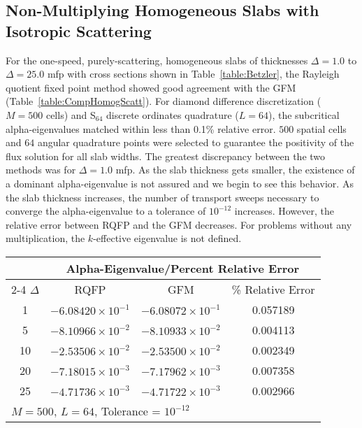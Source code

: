 \subsection{Non-Multiplying Homogeneous Slabs with Isotropic Scattering}
For the one-speed, purely-scattering, homogeneous slabs of thicknesses $\Delta = 1.0$ to $\Delta = 25.0$ mfp with cross sections shown in Table~\ref{table:Betzler}, the Rayleigh quotient fixed point method showed good agreement with the GFM (Table~\ref{table:CompHomogScatt}). For diamond difference discretization ($M = 500$ cells) and S$_{64}$ discrete ordinates quadrature ($L = 64$), the subcritical alpha-eigenvalues matched within less than 0.1\% relative error. $500$ spatial cells and $64$ angular quadrature points were selected to guarantee the positivity of the flux solution for all slab widths. The greatest discrepancy between the two methods was for $\Delta = 1.0$ mfp. As the slab thickness gets smaller, the existence of a dominant alpha-eigenvalue is not assured and we begin to see this behavior. As the slab thickness increases, the number of transport sweeps necessary to converge the alpha-eigenvalue to a tolerance of $10^{-12}$ increases. However, the relative error between RQFP and the GFM decreases. For problems without any multiplication, the $k$-effective eigenvalue is not defined.

\begin{table*}[!htbp]
\centering{}
\caption{Comparison of RQFP- and GFM-calculated Alpha-Eigenvalues for a Homogeneous Scattering Slab}
\label{table:CompHomogScatt}
\begin{tabular}{@{}cccc@{}}\toprule
& \multicolumn{3}{c}{Alpha-Eigenvalue/Percent Relative Error} \\
\cmidrule{2-4} $\Delta$ & RQFP & GFM & \% Relative Error \\
\midrule
1 & $-6.08420 \times 10^{-1}$ & $-6.08072 \times 10^{-1}$ & 0.057189 \\ 
5 & $-8.10966 \times 10^{-2}$ & $-8.10933 \times 10^{-2}$ & 0.004113 \\ 
10 & $-2.53506 \times 10^{-2}$ & $-2.53500 \times 10^{-2}$ & 0.002349 \\ 
20 & $-7.18015 \times 10^{-3}$ & $-7.17962 \times 10^{-3}$ & 0.007358 \\ 
25 & $-4.71736 \times 10^{-3}$ & $-4.71722 \times 10^{-3}$ & 0.002966 \\ 
\bottomrule
\multicolumn{4}{l}{$M = 500$, $L = 64$, Tolerance = $10^{-12}$} \\
\end{tabular}
\end{table*}

